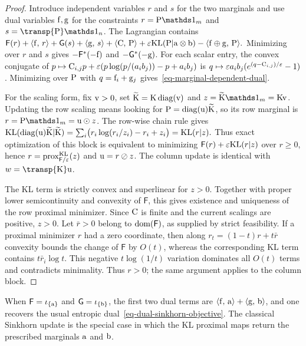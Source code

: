 \begin{proof}
Introduce independent variables $r$ and $s$ for the two marginals and use dual variables $\fD,\gD$ for the constraints $r=\P\ones_m$ and $s=\transp{\P}\ones_n$. The Lagrangian contains
\(\mathsf F(r)+\dotp{\fD}{r} + \mathsf G(s)+\dotp{\gD}{s} + \dotp{\C}{\P} + \epsilon\KLD(\P|\a\otimes\b) - \dotp{\fD\oplus\gD}{\P}.\)
Minimizing over $r$ and $s$ gives $-\mathsf F^*(-\fD)$ and $-\mathsf G^*(-\gD)$. For each scalar entry, the convex conjugate of $p\mapsto \C_{i,j}p+\epsilon(p\log(p/(a_i b_j))-p+a_i b_j)$ is $q\mapsto \epsilon a_i b_j(e^{(q-\C_{i,j})/\epsilon}-1)$. Minimizing over $\P$ with $q=\fD_i+\gD_j$ gives~\eqref{eq-marginal-dependent-dual}.

For the scaling form, fix $\vD>0$, set $\widetilde{\K}=\K\diag(\vD)$ and $z=\widetilde{\K}\ones_m=\K\vD$. Updating the row scaling means looking for $\P=\diag(\uD)\widetilde{\K}$, so its row marginal is $r=\P\ones_m=\uD\odot z$. The row-wise chain rule gives
\(\KLD(\diag(\uD)\widetilde{\K}|\widetilde{\K}) = \sum_i \bigl(r_i\log(r_i/z_i)-r_i+z_i\bigr) = \KLD(r|z).\)
Thus exact optimization of this block is equivalent to minimizing $\mathsf F(r)+\epsilon\KLD(r|z)$ over $r\geq0$, hence $r=\prox_{\mathsf F/\epsilon}^{\KLD}(z)$ and $\uD=r\oslash z$. The column update is identical with $w=\transp{\K}\uD$.

The KL term is strictly convex and superlinear for $z>0$. Together with proper lower semicontinuity and convexity of $\mathsf F$, this gives existence and uniqueness of the row proximal minimizer. Since $\C$ is finite and the current scalings are positive, $z>0$. Let $\bar r>0$ belong to $\dom(\mathsf F)$, as supplied by strict feasibility. If a proximal minimizer $r$ had a zero coordinate, then along $r_t=(1-t)r+t\bar r$ convexity bounds the change of $\mathsf F$ by $O(t)$, whereas the corresponding KL term contains $t\bar r_i\log t$. This negative $t\log(1/t)$ variation dominates all $O(t)$ terms and contradicts minimality. Thus $r>0$; the same argument applies to the column block.
\end{proof}
When $\mathsf F=\iota_{\{\a\}}$ and $\mathsf G=\iota_{\{\b\}}$, the first two dual terms are $\dotp{\fD}{\a}+\dotp{\gD}{\b}$, and one recovers the usual entropic dual~\eqref{eq-dual-sinkhorn-objective}. The classical Sinkhorn update is the special case in which the KL proximal maps return the prescribed marginals $\a$ and $\b$.


